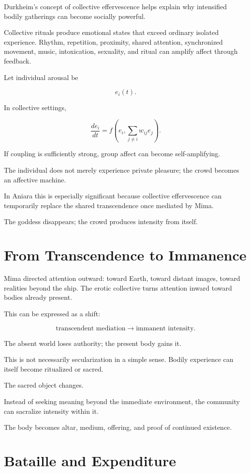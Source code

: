 \documentclass[11pt,oneside]{book}
\theoremstyle{definition}
\theoremstyle{remark}
\begin{document}
Durkheim's concept of collective effervescence helps explain why intensified bodily gatherings can become socially powerful.

Collective rituals produce emotional states that exceed ordinary isolated experience. Rhythm, repetition, proximity, shared attention, synchronized movement, music, intoxication, sexuality, and ritual can amplify affect through feedback.

Let individual arousal be

\[
e_i(t).
\]

In collective settings,

\[
\frac{de_i}{dt}
=
f(
e_i,
\sum_{j\neq i}w_{ij}e_j
).
\]

If coupling is sufficiently strong, group affect can become self-amplifying.

The individual does not merely experience private pleasure; the crowd becomes an affective machine.

In Aniara this is especially significant because collective effervescence can temporarily replace the shared transcendence once mediated by Mima.

The goddess disappears; the crowd produces intensity from itself.

\section{From Transcendence to Immanence}

Mima directed attention outward: toward Earth, toward distant images, toward realities beyond the ship. The erotic collective turns attention inward toward bodies already present.

This can be expressed as a shift:

\[
\text{transcendent mediation}
\rightarrow
\text{immanent intensity}.
\]

The absent world loses authority; the present body gains it.

This is not necessarily secularization in a simple sense. Bodily experience can itself become ritualized or sacred.

The sacred object changes.

Instead of seeking meaning beyond the immediate environment, the community can sacralize intensity within it.

The body becomes altar, medium, offering, and proof of continued existence.

\section{Bataille and Expenditure}
\end{document}
